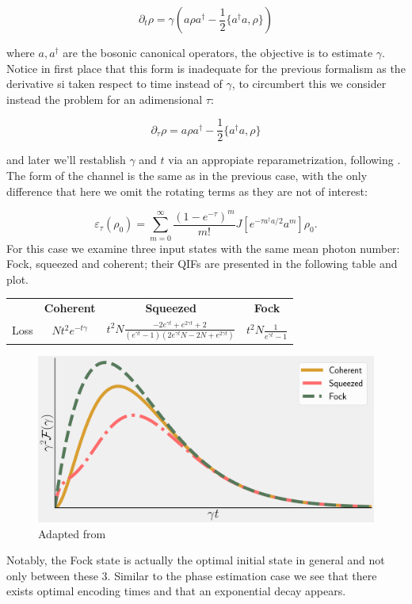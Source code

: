 \begin{equation}
  \partial_{t} \rho = \gamma(a\rho a^{\dagger} -\frac{1}{2}\{a^{\dagger}a, \rho\})
\end{equation}

where $a,a^{\dagger}$ are the bosonic canonical operators, the objective is to estimate $\gamma$. Notice in first place that this form
is inadequate for the previous formalism as the derivative si taken respect to time instead of $\gamma$, to circumbert this we consider
instead the problem for an adimensional $\tau$:

\begin{equation}
  \partial_{\tau} \rho = a\rho a^{\dagger} -\frac{1}{2}\{a^{\dagger}a, \rho\}
\end{equation}

and later we'll restablish $\gamma$ and $t$ via an appropiate reparametrization, following \cite{adesso_optimal_2009,monras_optimal_2007}.
The form of the channel is the same as in the previous case, with the only difference that here we omit the rotating terms as they are not of
interest:

\begin{equation}
 \varepsilon_{\tau}(\rho_{0}) = \sum_{m=0}^{\infty}\frac{(1-e^{-\tau})^{m}}{m!}J[e^{-\tau a^{\dagger}a/2}a^{m}]\rho_{0}.
\end{equation}
For this case we examine three input states with the same mean photon number: Fock, squeezed and coherent;
their QIFs are presented in the following table and plot.

\begin{center}
      \begin{tabular}{c c c c }
        &\textbf{Coherent} & \textbf{Squeezed}  & \textbf{Fock}   \\
        Loss & $N t^{2}e^{-t\gamma}$ & $ t^{2}N \frac{-2e^{\gamma t} +e^{2\gamma t}+2}{(e^{\gamma t}-1)(2e^{\gamma t}N-2N +e^{2\gamma t})}$ & $t^{2}N \frac{1}{e^{\gamma t}-1}$\\
      \end{tabular}
      \label{tab:table1}
\end{center}

\begin{figure}[h]
    \centering
    \includegraphics[scale=0.35]{Images/Loss_QFI_Plot.pdf}
    \caption{Adapted from \cite{rossi_2016}}
\end{figure}

Notably, the Fock state is actually the optimal initial state \cite{adesso_optimal_2009} in general and not
only between these 3. Similar to the phase estimation case we see that there exists optimal encoding times and that an exponential decay appears.
